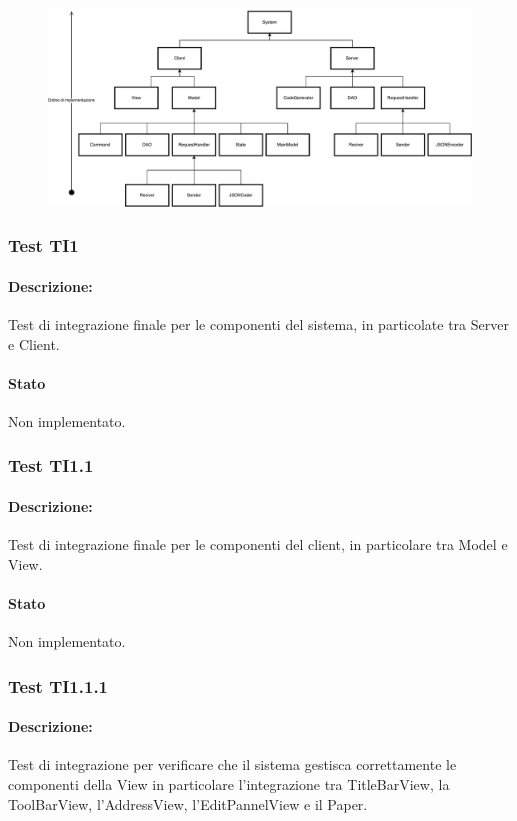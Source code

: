 \documentclass[../PianoDiQualifica.tex]{subfiles}
\begin{document}
	\begin{figure}[htbp]
		\centering
		\includegraphics[scale=0.4]{../../../Immagini/TestIntegr.pdf}
	\end{figure}
	
		
	\subsubsection{Test TI1}
	\paragraph{Descrizione:} Test di integrazione finale per le componenti del sistema, in particolate tra Server e Client.
	\paragraph{Stato} Non implementato.
	
	\subsubsection{Test TI1.1}
	\paragraph{Descrizione:} Test di integrazione finale per le componenti del client, in particolare tra  Model e View.
	\paragraph{Stato} Non implementato.
	\subsubsection{Test TI1.1.1}
	\paragraph{Descrizione:} Test di integrazione per verificare che il sistema gestisca correttamente le componenti della View in particolare l'integrazione tra TitleBarView, la ToolBarView, l'AddressView, l'EditPannelView e il Paper.
\end{document}

